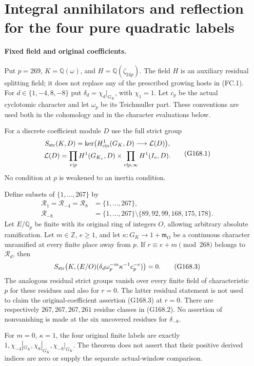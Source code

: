 \section{Integral annihilators and reflection for the four pure quadratic labels}
\label{sec:abelian-reflection-strict-vanishing}

\paragraph{Fixed field and original coefficients.}
Put $p=269$, $K=\mathbb Q(\omega)$, and
$H=\mathbb Q(\zeta_{24p})$.
The field $H$ is an auxiliary residual splitting field; it does
not replace any of the prescribed growing hosts in (FC.1).
For $d\in\{1,-4,8,-8\}$ put
$\delta_d=\chi_d|_{G_K}$, with $\chi_1=1$.
Let $c_p$ be the actual cyclotomic character and let $\omega_p$
be its Teichmuller part.  These conventions are used both in
the cohomology and in the character evaluations below.

For a discrete coefficient module $D$ use the full strict group
\[
 \begin{gathered}
 S_{\rm str}(K,D)=\ker\bigl(H^1_{\rm cts}(G_K,D)
                                  \longrightarrow\mathcal L(D)\bigr),\\
 \mathcal L(D)=\prod_{v\mid p}H^1(G_{K_v},D)
                   \times\prod_{v\nmid p,\infty}H^1(I_v,D).
 \end{gathered}
 \tag{G168.1}
\]
No condition at $p$ is weakened to an inertia condition.

\begin{theorem}
\label{AC-G168}
Define subsets of $\{1,\ldots,267\}$ by
\[
 \begin{aligned}
 \mathcal R_1=\mathcal R_{-4}=\mathcal R_8
      &=\{1,\ldots,267\},\\
 \mathcal R_{-8}
      &=\{1,\ldots,267\}\setminus\{89,92,99,168,175,178\}.
 \end{aligned}
 \tag{G168.2}
\]
Let $E/\mathbb Q_p$ be finite with its original ring of integers
$O$, allowing arbitrary absolute ramification.
Let $m\in\mathbb Z$, $e\geq1$, and let
$\kappa:G_K\to1+\mathfrak m_O$ be a continuous character
unramified at every finite place away from $p$.
If $r\equiv e+m\pmod{268}$ belongs to $\mathcal R_d$, then
\[
 S_{\rm str}\bigl(K,(E/O)
       (\delta_d\omega_p^{-m}\kappa^{-1}c_p^{-e})\bigr)=0.
 \tag{G168.3}
\]
The analogous residual strict groups vanish over every finite
field of characteristic $p$ for these residues and also for
$r=0$.  The latter residual statement is not used to claim
the original-coefficient assertion (G168.3) at $r=0$.
There are respectively $267,267,267,261$ residue classes in
(G168.2).  No assertion of nonvanishing is made at the six
uncovered residues for $\delta_{-8}$.

For $m=0$, $\kappa=1$, the four original finite labels are
exactly $1,\chi_{-4}|_{G_K},\chi_8|_{G_K},\chi_{-8}|_{G_K}$.
The theorem does not assert that their positive derived indices
are zero or supply the separate actual-window comparison.
\end{theorem}

